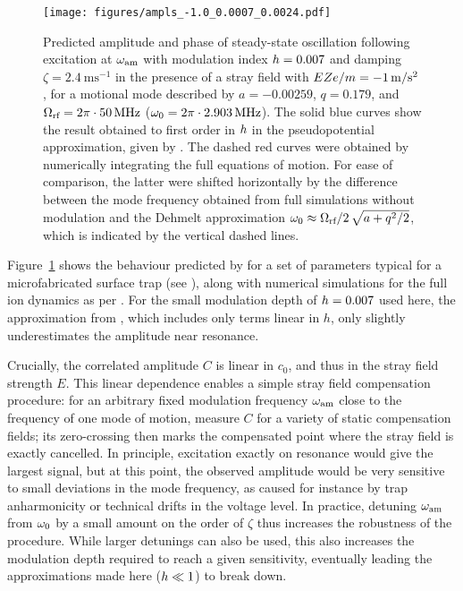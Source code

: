 \documentclass[pra,twocolumn]{revtex4-2}
\begin{document}
\begin{figure}
	\texttt{[image: figures/ampls\_-1.0\_0.0007\_0.0024.pdf]}
	\caption{
		Predicted amplitude and phase of steady-state oscillation following excitation at $\omega_{\textrm{am}}$ with modulation index $h = 0.007$ and damping $\zeta = \SI{2.4}{\milli\second^{-1}}$ in the presence of a stray field with $E Z e / m = \SI{-1}{m / s^2}$, for a motional mode described by $a = -0.00259$, $q = 0.179$, and $\wRF = 2 \pi \cdot \SI{50}{\MHz}$ ($\wm = 2 \pi \cdot \SI{2.903}{\MHz}$).
		The solid blue curves show the result obtained to first order in $h$ in the pseudopotential approximation, given by .
		The dashed red curves were obtained by numerically integrating the full equations of motion.
		For ease of comparison, the latter were shifted horizontally by the difference between the mode frequency obtained from full simulations without modulation and the Dehmelt approximation $\omega_{\textrm{0}} \approx \Omega_{\textrm{rf}} / 2 \, \sqrt{a + q^2 / 2}$, which is indicated by the vertical dashed lines.
	}
	\label{fig:theory-freq-scan}
\end{figure}

Figure~\ref{fig:theory-freq-scan} shows the behaviour predicted by  for a set of parameters typical for a microfabricated surface trap (see ), along with numerical simulations for the full ion dynamics as per .
For the small modulation depth of $h = 0.007$ used here, the approximation from , which includes only terms linear in $h$, only slightly underestimates the amplitude near resonance.

Crucially, the correlated amplitude $C$ is linear in $c_0$, and thus in the stray field strength $E$.
This linear dependence enables a simple stray field compensation procedure:
for an arbitrary fixed modulation frequency $\omega_{\textrm{am}}$ close to the frequency of one mode of motion, measure $C$ for a variety of static compensation fields; its zero-crossing then marks the compensated point where the stray field is exactly cancelled.
In principle, excitation exactly on resonance would give the largest signal, but at this point, the observed amplitude would be very sensitive to small deviations in the mode frequency, as caused for instance by trap anharmonicity or technical drifts in the \RF{} voltage level.
In practice, detuning $\omega_{\textrm{am}}$ from $\omega_{\textrm{0}}$ by a small amount on the order of $\zeta$ thus increases the robustness of the procedure.
While larger detunings can also be used, this also increases the modulation depth required to reach a given sensitivity, eventually leading the approximations made here ($h \ll 1$) to break down.
\end{document}
